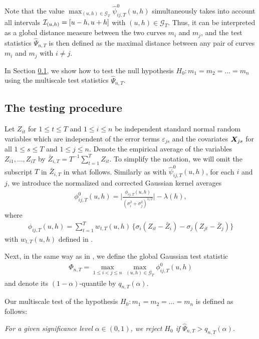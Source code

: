 \documentclass[a4paper,12pt]{article}
\makeatletter
\renewcommand{\eqref}[1]{\tagform@{\ref{#1}}}
\makeatother
\begin{document}
Note that the value $\max_{(u,h) \in \mathcal{G}_T} \hat{\psi}^0_{ij,T}(u, h)$ simultaneously takes into account all intervals $\mathcal{I}_{(u, h)} = [u- h, u+h]$ with $(u,h) \in \mathcal{G}_T$. Thus, it can be interpreted as a global distance measure between the two curves $m_i$ and $m_j$, and the test statistics $\widehat{\Psi}_{n,T}$ is then defined as the maximal distance between any pair of curves $m_i$ and $m_j$ with $i \ne j$.

In Section \ref{subsec:test:test}, we show how to test the null hypothesis $H_0: m_1 =m_2 = \ldots = m_n$ using the multiscale test statistics $\widehat{\Psi}_{n,T}$.

\subsection{The testing procedure}\label{subsec:test:test}


Let $Z_{it}$ for $1 \le t \le T$ and $1 \le i \le n$ be independent standard normal random variables which are independent of the error terms $\varepsilon_{js}$ and the covariates $\boldsymbol{X}_{js}$ for all $1 \leq s \leq T $ and $1 \leq j \leq n$. Denote the empirical average of the variables $Z_{i1},\ldots,Z_{iT}$ by $\bar{Z}_{i,T} = T^{-1} \sum_{t=1}^T Z_{it}$. To simplify the notation, we will omit the subscript $T$ in $\bar{Z}_{i,T}$ in what follows. Similarly as with $\hat{\psi}^0_{ij,T}(u, h)$, for each $i$ and $j$, we introduce the normalized and corrected Gaussian kernel averages 
\begin{align}\label{eq:phi_zero_ij}
\phi^0_{ij,T}(u, h) =  \bigg|\frac{\phi_{ij,T}(u,h)}{(\sigma_i^2 + \sigma_j^2)^{1/2}}\bigg| - \lambda(h),
\end{align}
where 
\begin{align}\label{eq:phi_ij}
\phi_{ij,T}(u,h) = \sum\nolimits_{t=1}^T w_{t,T}(u,h) \, \big\{ \sigma_i (Z_{it} - \bar{Z}_i) - \sigma_j (Z_{jt} - \bar{Z}_j) \big\}
\end{align}
with $w_{t, T}(u, h)$ defined in \eqref{eq:weights}. 

Next, in the same way as in \eqref{eq:Psi_hat}, we define the global Gaussian test statistic
\begin{align}\label{eq:Phi}
\Phi_{n,T} = \max_{1 \le i < j \le n}\max_{(u,h) \in \mathcal{G}_T} \phi^0_{ij,T}(u, h)
\end{align}
and denote its $(1-\alpha)$-quantile by $q_{n,T}(\alpha)$.

Our multiscale test of the hypothesis $H_0: m_1 = m_2 = \ldots = m_n$ is defined as follows: 
\begin{center}
\begin{minipage}[c][0.75cm][c]{13cm}
\textit{For a given significance level $\alpha \in (0,1)$, we reject $H_0$ if $\widehat{\Psi}_{n,T} > q_{n,T}(\alpha)$.}
\end{minipage}
\end{center}
\end{document}
